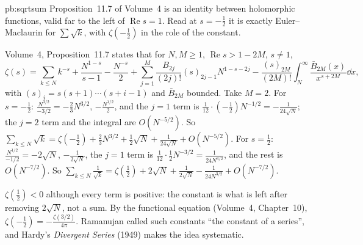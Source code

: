 \begin{solution}{pb:sqrtsum}
\idea Proposition~11.7 of Volume~4 is an identity between holomorphic functions, valid far to the left of $\operatorname{Re}s=1$. Read at $s=-\frac12$ it is exactly Euler--Maclaurin for $\sum\sqrt k$, with $\zeta(-\frac12)$
in the role of the constant.

\writeup Volume~4, Proposition~11.7 states that for $N,M\ge1$, $\operatorname{Re}s>1-2M$, $s\ne1$,
\[
\zeta(s)=\sum_{k\le N}k^{-s}+\frac{N^{1-s}}{s-1}-\frac{N^{-s}}2+\sum_{j=1}^M\frac{B_{2j}}{(2j)!}(s)_{2j-1}N^{1-s-2j}-\frac{(s)_{2M}}{(2M)!}\int_N^\infty\frac{\bar B_{2M}(x)}{x^{s+2M}}\dd x,
\]
with $(s)_i=s(s+1)\cdots(s+i-1)$ and $\bar B_{2M}$ bounded. Take $M=2$. For $s=-\frac12$: $\frac{N^{3/2}}{-3/2}=-\frac23N^{3/2}$, $-\frac{N^{1/2}}2$, and the $j=1$ term is $\frac1{12}\cdot(-\frac12)N^{-1/2}=-\frac1{24\sqrt N}$; the $j=2$ term
and the integral are $O(N^{-5/2})$. So $\sum_{k\le N}\sqrt k=\zeta(-\frac12)+\frac23N^{3/2}+\frac12\sqrt N+\frac1{24\sqrt N}+O(N^{-5/2})$. For $s=\frac12$: $\frac{N^{1/2}}{-1/2}=-2\sqrt N$, $-\frac1{2\sqrt N}$, the $j=1$ term is
$\frac1{12}\cdot\frac12N^{-3/2}=\frac1{24N^{3/2}}$, and the rest is $O(N^{-7/2})$. So $\sum_{k\le N}\frac1{\sqrt k}=\zeta(\frac12)+2\sqrt N+\frac1{2\sqrt N}-\frac1{24N^{3/2}}+O(N^{-7/2})$.

\leads $\zeta(\frac12)<0$ although every term is positive: the constant is what is left after removing $2\sqrt N$, not a sum. By the functional equation (Volume~4, Chapter~10),
$\zeta(-\frac12)=-\frac{\zeta(3/2)}{4\pi}$. Ramanujan called such constants ``the constant of a series'', and Hardy's \emph{Divergent Series} (1949) makes the idea systematic.
\end{solution}

